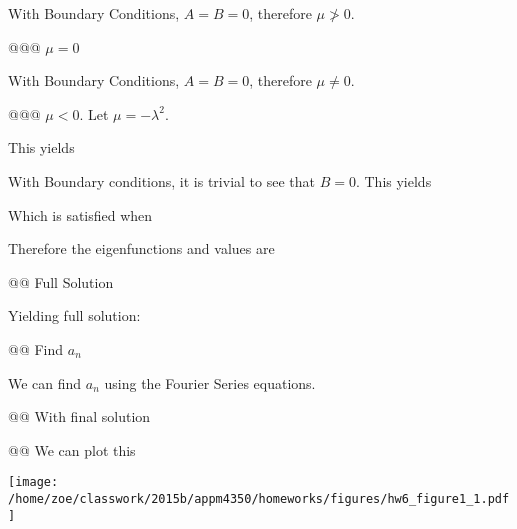 \documentclass[10pt]{article}
\begin{document}
\begin{easylist}[enumerate]
    With Boundary Conditions, $A = B = 0$, therefore $\mu \not> 0$.

    @@@ $\mu = 0$


    With Boundary Conditions, $A = B = 0$, therefore $\mu \neq 0$.

    @@@ $\mu < 0$. Let $\mu = -\lambda^2$.

    This yields


    With Boundary conditions, it is trivial to see that $B = 0$. This yields


    Which is satisfied when


    Therefore the eigenfunctions and values are


    @@ Full Solution

    Yielding full solution:


    @@ Find $a_n$

    We can find $a_n$ using the Fourier Series equations.


    @@ With final solution


    @@ We can plot this

\simpleweave

\texttt{[image: /home/zoe/classwork/2015b/appm4350/homeworks/figures/hw6\_figure1\_1.pdf]}


\end{easylist}
\end{document}
